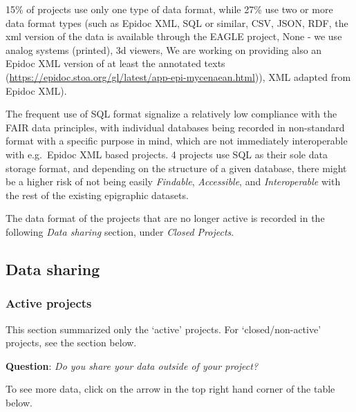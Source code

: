 \documentclass[
  10pt,
]{article}
\begin{document}
15\% of projects use only one type of data format, while 27\% use two or
more data format types (such as Epidoc XML, SQL or similar, CSV, JSON,
RDF, the xml version of the data is available through the EAGLE project,
None - we use analog systems (printed), 3d viewers, We are working on
providing also an Epidoc XML version of at least the annotated texts
(\url{https://epidoc.stoa.org/gl/latest/app-epi-mycenaean.html})), XML
adapted from Epidoc XML).

The frequent use of SQL format signalize a relatively low compliance
with the FAIR data principles, with individual databases being recorded
in non-standard format with a specific purpose in mind, which are not
immediately interoperable with e.g.~Epidoc XML based projects. 4
projects use SQL as their sole data storage format, and depending on the
structure of a given database, there might be a higher risk of not being
easily \emph{Findable}, \emph{Accessible}, and \emph{Interoperable} with
the rest of the existing epigraphic datasets.

The data format of the projects that are no longer active is recorded in
the following \emph{Data sharing} section, under \emph{Closed Projects}.

\hypertarget{data-sharing-1}{%
\subsection{Data sharing}\label{data-sharing-1}}

\hypertarget{active-projects}{%
\subsubsection{Active projects}\label{active-projects}}

This section summarized only the `active' projects. For
`closed/non-active' projects, see the section below.

\textbf{Question}: \emph{Do you share your data outside of your
project?}

To see more data, click on the arrow in the top right hand corner of the
table below.
\end{document}
